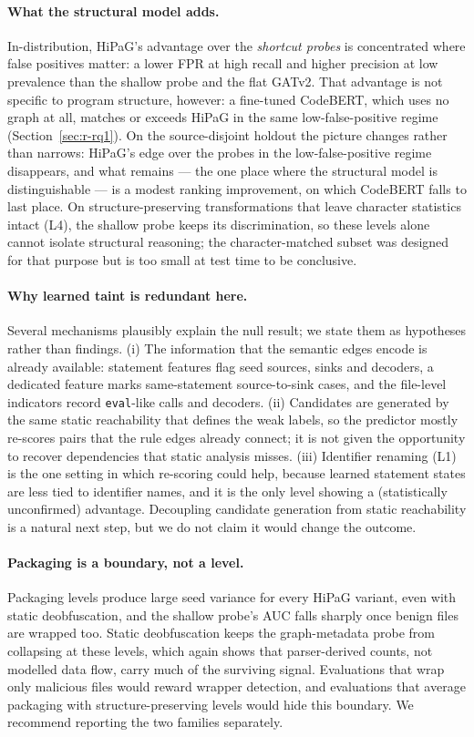 \documentclass[pdflatex,sn-mathphys-num]{sn-jnl}
\begin{document}
\paragraph{What the structural model adds.} In-distribution, HiPaG's advantage
over the \emph{shortcut probes} is concentrated where false positives matter: a
lower FPR at high recall and higher precision at low prevalence than the
shallow probe and the flat GATv2. That advantage is not specific to program
structure, however: a fine-tuned CodeBERT, which uses no graph at all, matches
or exceeds HiPaG in the same low-false-positive regime
(Section~\ref{sec:r-rq1}). On the source-disjoint holdout the picture changes
rather than narrows: HiPaG's edge over the probes in the low-false-positive
regime disappears, and what remains --- the one place where the structural
model is distinguishable --- is a modest ranking improvement, on which CodeBERT
falls to last place. On structure-preserving transformations that leave character
statistics intact (L4), the shallow probe keeps its discrimination, so these
levels alone cannot isolate structural reasoning; the character-matched subset
was designed for that purpose but is too small at test time to be conclusive.

\paragraph{Why learned taint is redundant here.} Several mechanisms plausibly
explain the null result; we state them as hypotheses rather than findings.
(i) The information that the semantic edges encode is already available:
statement features flag seed sources, sinks and decoders, a dedicated feature
marks same-statement source-to-sink cases, and the file-level indicators record
\texttt{eval}-like calls and decoders. (ii) Candidates are generated by the
same static reachability that defines the weak labels, so the predictor mostly
re-scores pairs that the rule edges already connect; it is not given the
opportunity to recover dependencies that static analysis misses.
(iii) Identifier renaming (L1) is the one setting in which re-scoring could
help, because learned statement states are less tied to identifier names, and
it is the only level showing a (statistically unconfirmed) advantage. Decoupling
candidate generation from static reachability is a natural next step, but we do
not claim it would change the outcome.

\paragraph{Packaging is a boundary, not a level.} Packaging levels produce large
seed variance for every HiPaG variant, even with static deobfuscation, and the
shallow probe's AUC falls sharply once benign files are wrapped too. Static
deobfuscation keeps the graph-metadata probe from collapsing at these levels,
which again shows that parser-derived counts, not modelled data flow, carry much
of the surviving signal. Evaluations that wrap only malicious files would reward
wrapper detection, and evaluations that average packaging with
structure-preserving levels would hide this boundary. We recommend reporting the
two families separately.
\end{document}
